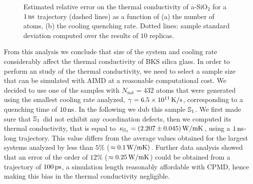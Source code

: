 \begin{figure}[!tb]
    \centering
    \hfill
    \caption{Estimated relative error on the thermal conductivity of a-SiO$_2$ for a $1\,\mathrm{ns}$ trajectory (dashed lines) as a function of (a) the number of atoms, (b) the cooling quenching rate. 
    Dotted lines: sample standard deviation computed over the results of $10$ replicas.
    }
    \label{fig:results-class-kappaerror}
\end{figure}

From this analysis we conclude that size of the system and cooling rate considerably affect the thermal conductivity of BKS silica glass. 
In order to perform an \abinitio study of the thermal conductivity, we need to select a sample size that can be simulated with AIMD at a reasonable computational cost. 
We decided to use one of the samples with $N_{\mathrm{nat}}=432$ atoms that were generated using the smallest cooling rate analyzed, $\gamma=6.5\times 10^{11}\,\mathrm{K/s}$, corresponding to a quenching time of $10\,\mathrm{ns}$. In the following we dub this sample $\S1$. 
We first made sure that $\S1$ did not exhibit any coordination defects, then we computed its thermal conductivity, that is equal to $\kappa_\S1 = (2.207 \pm 0.045) \un{W/mK}$, using a $1\,\mathrm{ns}$-long trajectory. 
This value differs from the average values obtained for the largest systems analyzed by less than $5\%$ ($\approx 0.1\,\mathrm{W/mK})$. 
Further data analysis showed that an error of the order of $12\%$ ($\approx 0.25\,\mathrm{W/mK}$) could be obtained from a trajectory of $100\,\mathrm{ps}$, a simulation length reasonably affordable with CPMD, hence making this bias in the thermal conductivity negligible. 


